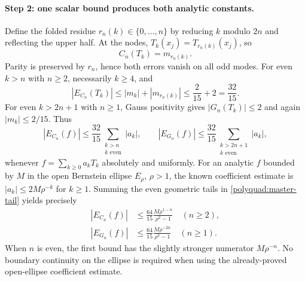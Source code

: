 \documentclass[11pt]{article}
\theoremstyle{remark}
\numberwithin{equation}{section}
\begin{document}
\paragraph{Step 2: one scalar bound produces both analytic constants.}
Define the folded residue $r_n(k)\in\{0,\ldots,n\}$ by reducing $k$
modulo $2n$ and reflecting the upper half. At the nodes,
$T_k(x_j)=T_{r_n(k)}(x_j)$, so
\begin{equation}
 C_n(T_k)=m_{r_n(k)}.
 \label{polyquad:alias-moment}
\end{equation}
Parity is preserved by $r_n$, hence both errors vanish on all odd modes.
For even $k>n$ with $n\ge2$, necessarily $k\ge4$, and
\[
 |E_{C_n}(T_k)|\le |m_k|+|m_{r_n(k)}|
                 \le\frac2{15}+2=\frac{32}{15}.
\]
For even $k>2n+1$ with $n\ge1$, Gauss positivity gives
$|G_n(T_k)|\le2$ and again $|m_k|\le2/15$. Thus
\begin{equation}
 |E_{C_n}(f)|\le\frac{32}{15}
        \sum_{\substack{k>n\\k\text{ even}}}|a_k|,
 \qquad
 |E_{G_n}(f)|\le\frac{32}{15}
        \sum_{\substack{k>2n+1\\k\text{ even}}}|a_k|,
 \label{polyquad:master-tail}
\end{equation}
whenever $f=\sum_{k\ge0}a_kT_k$ absolutely and uniformly.
For an analytic $f$ bounded by $M$ in the open Bernstein ellipse
$E_\rho$, $\rho>1$, the known coefficient estimate is
$|a_k|\le2M\rho^{-k}$ for $k\ge1$. Summing the even geometric tails
in \eqref{polyquad:master-tail} yields precisely
\begin{align}
 |E_{C_n}(f)|&\le\frac{64}{15}
       \frac{M\rho^{1-n}}{\rho^2-1}\quad(n\ge2),
       \label{polyquad:cc-analytic}\\
 |E_{G_n}(f)|&\le\frac{64}{15}
       \frac{M\rho^{-2n}}{\rho^2-1}\quad(n\ge1).
       \label{polyquad:gauss-analytic}
\end{align}
When $n$ is even, the first bound has the slightly stronger numerator
$M\rho^{-n}$. No boundary continuity on the ellipse is required when
using the already-proved open-ellipse coefficient estimate.
\end{document}
